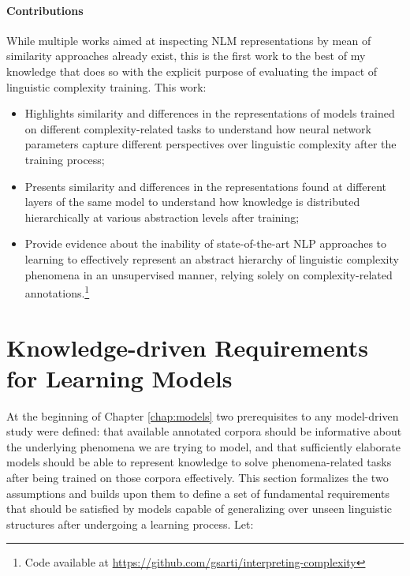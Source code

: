 \documentclass[a4paper, nobind]{templates/ociamthesis}
\begin{document}
\paragraph{Contributions} While multiple works aimed at inspecting NLM representations by mean of similarity approaches already exist, this is the first work to the best of my knowledge that does so with the explicit purpose of evaluating the impact of linguistic complexity training. This work:

\begin{itemize}
\item
  Highlights similarity and differences in the representations of models trained on different complexity-related tasks to understand how neural network parameters capture different perspectives over linguistic complexity after the training process;
\item
  Presents similarity and differences in the representations found at different layers of the same model to understand how knowledge is distributed hierarchically at various abstraction levels after training;
\item
  Provide evidence about the inability of state-of-the-art NLP approaches to learning to effectively represent an abstract hierarchy of linguistic complexity phenomena in an unsupervised manner, relying solely on complexity-related annotations.\footnote{Code available at \url{https://github.com/gsarti/interpreting-complexity}}
\end{itemize}

\hypertarget{knowledge-driven-requirements-for-learning-models}{%
\section{Knowledge-driven Requirements for Learning Models}\label{knowledge-driven-requirements-for-learning-models}}

At the beginning of Chapter \ref{chap:models} two prerequisites to any model-driven study were defined: that available annotated corpora should be informative about the underlying phenomena we are trying to model, and that sufficiently elaborate models should be able to represent knowledge to solve phenomena-related tasks after being trained on those corpora effectively. This section formalizes the two assumptions and builds upon them to define a set of fundamental requirements that should be satisfied by models capable of generalizing over unseen linguistic structures after undergoing a learning process. Let:
\end{document}

